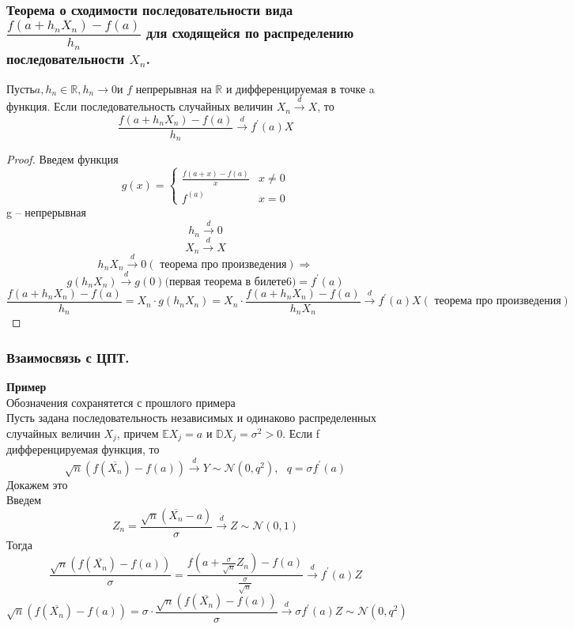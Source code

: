 	\subsubsection{Теорема о сходимости последовательности вида $\dfrac{f(a + h_n X_n) - f(a)}{h_n}$ для сходящейся по распределению последовательности $X_n$. }
	\begin{theorem*}
		Пусть$  a, h_n \in \mathbb{R}, h_n\to0 $и $ f $ непрерывная на $ \mathbb{R} $ и дифференцируемая в точке a функция. Если последовательность случайных величин $ X_n \xrightarrow{d} X $, то
		$$\frac{f(a + h_nX_n) - f(a)}{h_n}\xrightarrow{d}f^{'}(a)X$$
	\end{theorem*}
	\begin{proof}
		Введем функция
		\begin{equation*}
			g(x) = 
			\begin{cases}
				\frac{f(a + x) - f(a)}{x} & x\neq 0\\
				f^(a) & x = 0
			\end{cases}
		\end{equation*}
		g -- непрерывная
		$$h_n\xrightarrow{d} 0$$
		$$X_n\xrightarrow{d}X$$
		$$h_nX_n\xrightarrow{d}0(\text{ теорема про произведения})\Rightarrow$$
		$$g(h_nX_n)\xrightarrow{d}g(0)\text{(первая теорема в билете6)} = f^{'}(a)$$
		$$\frac{f(a + h_nX_n) - f(a)}{h_n} = X_n\cdot g(h_nX_n) = X_n\cdot\frac{f(a + h_nX_n) - f(a)}{h_nX_n} \xrightarrow{d}f^{'}(a)X(\text{ теорема про произведения})$$
	\end{proof}
	\subsubsection{Взаимосвязь с ЦПТ.}
	\textbf{Пример}\\
	Обозначения сохранятется с прошлого примера\\
	Пусть задана последовательность независимых и одинаково распределенных
	случайных величин $ X_j $, причем $  \mathbb{E}X_j = a$ и $\mathbb{D}X_j = \sigma^2 > 0 $. Если f дифференцируемая функция, то
	$$\sqrt{n}(f(\overline{X_n}) - f(a))\xrightarrow{d}Y\sim\mathcal{N}(0, q^2),\text{ }q=\sigma f^{'}(a)$$
	Докажем это\\
	Введем
	$$ Z_n = \frac{\sqrt{n}(\overline{X_n} - a)}{\sigma}\xrightarrow{d}Z\sim\mathcal{N}(0,1)$$
	Тогда
	$$\frac{\sqrt{n}(f(\overline{X_n}) - f(a))}{\sigma} = \frac{f(a + \frac{\sigma}{\sqrt{n}} Z_n) - f(a)}{\frac{\sigma}{\sqrt{n}}}\xrightarrow{d}f^{'}(a)Z$$
	$$\sqrt{n}(f(\overline{X_n}) - f(a)) = \sigma \cdot \frac{\sqrt{n}(f(\overline{X_n}) - f(a))}{\sigma}\xrightarrow{d}\sigma f^{'}(a)Z\sim \mathcal{N}(0, q^2)$$